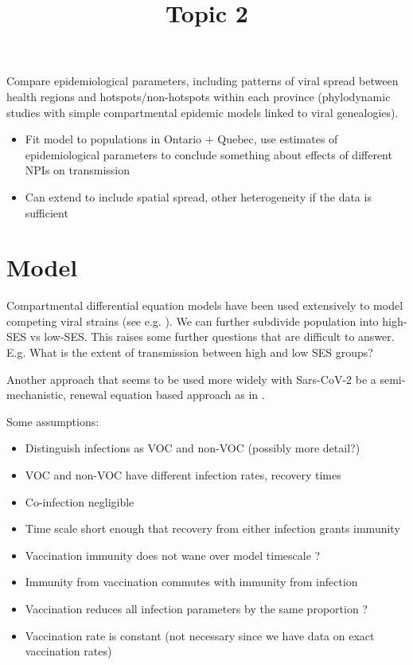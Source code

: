 \documentclass{article}
\begin{document}
\title{Topic 2}
\maketitle
Compare epidemiological parameters, including patterns of viral spread between health regions and hotspots/non-hotspots within each province (phylodynamic studies with simple compartmental epidemic models linked to viral genealogies).

\begin{itemize}
    \item Fit model to populations in Ontario + Quebec, use estimates of epidemiological parameters to conclude something about effects of different NPIs on transmission
    \item Can extend to include spatial spread, other heterogeneity if the data is sufficient
\end{itemize}


\section{Model}

Compartmental differential equation models have been used extensively to model competing viral strains (see e.g. \cite{Alizon_van_Baalen_2008, van_Baalen_Sabelis_1995, Lipsitch_Colijn_Cohen_Hanage_Fraser_2009, Nicoli_Ayabina_Trotter_Turner_Colijn_2015}). We can further subdivide population into high-SES vs low-SES. This raises some further questions that are difficult to answer. E.g. What is the extent of transmission between high and low SES groups? 

Another approach that seems to be used more widely with Sars-CoV-2 be a semi-mechanistic, renewal equation based approach as in \cite{Cauchemez_Nouvellet,Fraser_2007,Mishra_Berah_Mellan_Unwin_Vollmer_Parag_Gandy_Flaxman_Bhatt_2020,Nouvellet_Cori, Wallinga_Lipsitch_2007}.

Some assumptions: 
\begin{itemize}
    \item Distinguish infections as VOC and non-VOC (possibly more detail?)
    \item VOC and non-VOC have different infection rates, recovery times
    \item Co-infection negligible 
    \item Time scale short enough that recovery from either infection grants immunity
    \item Vaccination immunity does not wane over model timescale ?
    \item Immunity from vaccination commutes with immunity from infection 
    \item Vaccination reduces all infection parameters by the same proportion ?
    \item Vaccination rate is constant (not necessary since we have data on exact vaccination rates)
\end{itemize}
\end{document}
